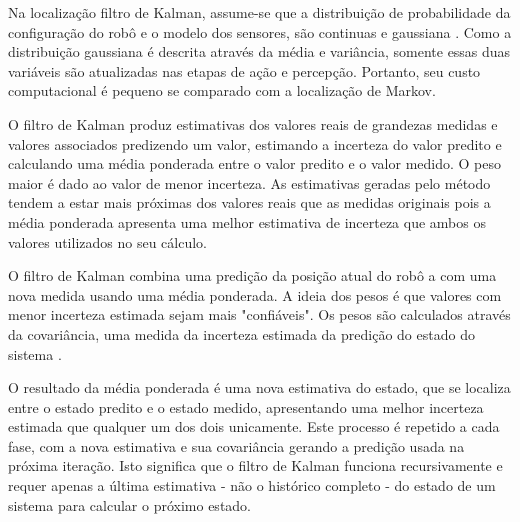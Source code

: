  
 Na localização filtro de Kalman, assume-se que a distribuição de probabilidade da configuração do robô e o modelo dos sensores,
 são continuas e gaussiana \cite{localization2}. Como a distribuição gaussiana é descrita através da média e variância, somente essas duas variáveis 
 são atualizadas nas etapas de ação e percepção. Portanto, seu custo computacional é pequeno se comparado com a localização de Markov.
 
O filtro de Kalman produz estimativas dos valores reais de grandezas medidas e valores associados predizendo um valor, 
estimando a incerteza do valor predito e calculando uma média ponderada entre o valor predito e o valor medido. 
O peso maior é dado ao valor de menor incerteza. As estimativas geradas pelo método tendem a estar mais próximas dos 
valores reais que as medidas originais pois a média ponderada apresenta uma melhor estimativa de incerteza que ambos os valores utilizados no seu cálculo.

 
  
O filtro de Kalman combina uma predição da posição atual do robô a com uma nova medida usando uma média ponderada. 
A ideia dos pesos é que valores com menor incerteza estimada sejam mais "confiáveis". 
Os pesos são calculados através da covariância, uma medida da incerteza estimada da predição do estado do sistema \cite{slam4}. 

O resultado da média ponderada é uma nova estimativa do estado, que se localiza entre o estado predito e o estado medido, 
apresentando uma melhor incerteza estimada que qualquer um dos dois unicamente. 
Este processo é repetido a cada fase, com a nova estimativa e sua covariância gerando a predição usada na próxima iteração. 
Isto significa que o filtro de Kalman funciona recursivamente e requer apenas a 
última estimativa - não o histórico completo - do estado de um sistema para calcular o próximo estado\cite{localization2}.


